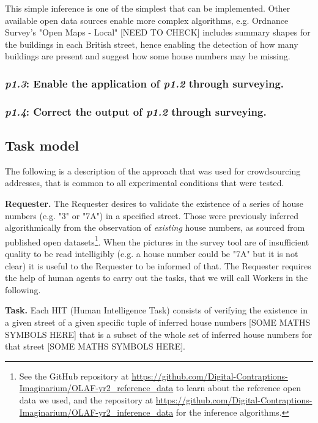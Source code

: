        This simple inference is one of the simplest that can be implemented. Other available open data sources enable more complex algorithms, e.g. Ordnance Survey's "Open Maps - Local" [NEED TO CHECK] includes summary shapes for the buildings in each British street, hence enabling the detection of how many buildings are present and suggest how some house numbers may be missing.
        
    \subsubsection{{\it p1.3}: Enable the application of {\it p1.2} through surveying.} 

    \subsubsection{{\it p1.4}: Correct the output of {\it p1.2} through surveying.} 

\subsection{Task model}

    The following is a description of the approach that was used for crowdsourcing addresses, that is common to all experimental conditions that were tested.
    
    \textbf{Requester.} The Requester desires to validate the existence of a series of house numbers (e.g. "3" or "7A") in a specified street. Those were previously inferred algorithmically from the observation of \textit{existing} house numbers, as sourced from published open datasets\footnote{See the GitHub repository at \url{https://github.com/Digital-Contraptions-Imaginarium/OLAF-yr2_reference_data} to learn about the reference open data we used, and the repository at \url{https://github.com/Digital-Contraptions-Imaginarium/OLAF-yr2_inference_data} for the inference algorithms.}. When the pictures in the survey tool are of insufficient quality to be read intelligibly (e.g. a house number could be "7A" but it is not clear) it is useful to the Requester to be informed of that. The Requester requires the help of human agents to carry out the tasks, that we will call Workers in the following.
    
    \textbf{Task.} Each HIT (Human Intelligence Task) consists of verifying the existence in a given street of a given specific tuple of inferred house numbers {[}SOME MATHS SYMBOLS HERE{]} that is a subset of the whole set of inferred house numbers for that street {[}SOME MATHS SYMBOLS HERE{]}. 
    
